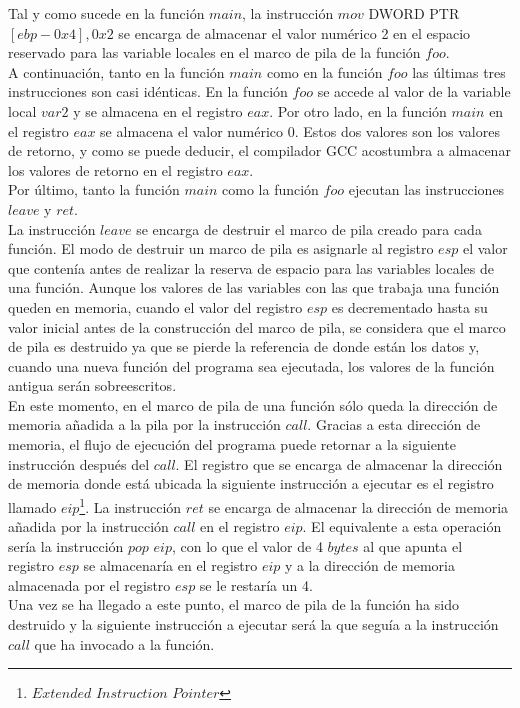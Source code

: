 \documentclass [titlepage, 12pt]{article}
\begin{document}
Tal y como sucede en la funci\'on $main$, la instrucci\'on $mov$ DWORD PTR $[ebp-0x4], 0x2$ se encarga de almacenar el valor num\'erico 2 en el espacio reservado para las variable locales en el marco de pila de la funci\'on $foo$.\\
A continuaci\'on, tanto en la funci\'on $main$ como en la funci\'on $foo$ las \'ultimas tres instrucciones son casi id\'enticas. En la funci\'on $foo$ se accede al valor de la variable local $var2$ y se almacena en el registro $eax$. Por otro lado, en la funci\'on $main$ en el registro $eax$ se almacena el valor num\'erico 0. Estos dos valores son los valores de retorno, y como se puede deducir, el compilador GCC acostumbra a almacenar los valores de retorno en el registro $eax$.\\

Por \'ultimo, tanto la funci\'on $main$ como la funci\'on $foo$ ejecutan las instrucciones $leave$ y $ret$.\\
La instrucci\'on $leave$ se encarga de destruir el marco de pila creado para cada funci\'on. El modo de destruir un marco de pila es asignarle al registro $esp$ el valor que conten\'ia antes de realizar la reserva de espacio para las variables locales de una funci\'on. Aunque los valores de las variables con las que trabaja una funci\'on queden en memoria, cuando el valor del registro $esp$ es decrementado hasta su valor inicial antes de la construcci\'on del marco de pila, se considera que el marco de pila es destruido ya que se pierde la referencia de donde est\'an los datos y, cuando una nueva funci\'on del programa sea ejecutada, los valores de la funci\'on antigua ser\'an sobreescritos.\\
En este momento, en el marco de pila de una funci\'on s\'olo queda la direcci\'on de memoria a\~nadida a la pila por la instrucci\'on $call$. Gracias a esta direcci\'on de memoria, el flujo de ejecuci\'on del programa puede retornar a la siguiente instrucci\'on despu\'es del $call$. El registro que se encarga de almacenar la direcci\'on de memoria donde est\'a ubicada la siguiente instrucci\'on a ejecutar es el registro llamado $eip$\footnote{$Extended$ $Instruction$ $Pointer$}. La instrucci\'on $ret$ se encarga de almacenar la direcci\'on de memoria a\~nadida por la instrucci\'on $call$ en el registro $eip$. El equivalente a esta operaci\'on ser\'ia la instrucci\'on $pop$ $eip$, con lo que el valor de 4 $bytes$ al que apunta el registro $esp$ se almacenar\'ia en el registro $eip$ y a la direcci\'on de memoria almacenada por el registro $esp$ se le restar\'ia un 4.\\
Una vez se ha llegado a este punto, el marco de pila de la funci\'on ha sido destruido y la siguiente instrucci\'on a ejecutar ser\'a la que segu\'ia a la instrucci\'on $call$ que ha invocado a la funci\'on.\\
\end{document}
